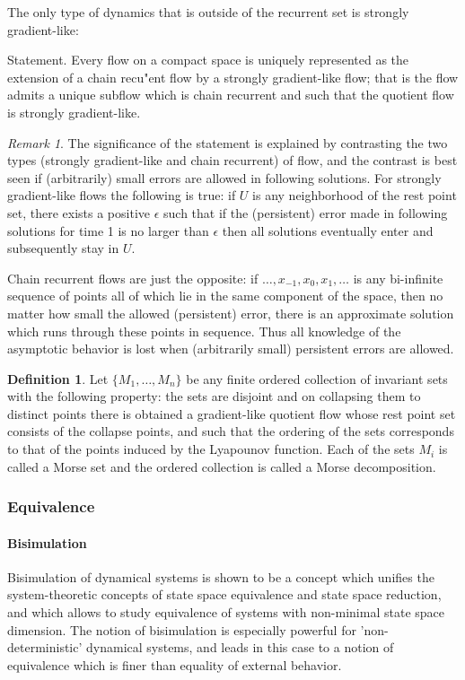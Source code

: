 \documentclass{scrartcl}
\theoremstyle{definition}
\newtheorem{definition}{Definition}
\theoremstyle{remark}
\newtheorem{remark}{Remark}
\begin{document}
The only type of dynamics that is outside of the recurrent set is strongly gradient-like:

Statement. Every flow on a compact space is uniquely represented as the extension of a chain recu"ent flow by a strongly gradient-like flow; that is the flow admits a unique subflow which is chain recurrent and such that the quotient flow is strongly gradient-like.

\begin{remark}\label{rem:error_noise}
The significance of the statement is explained by contrasting the two types (strongly gradient-like and chain recurrent) of flow, and the contrast is best seen if (arbitrarily) small errors are allowed in following solutions. For strongly gradient-like flows the following is true: if $U$ is any neighborhood of the rest point set, there exists a positive $\epsilon$ such that if the (persistent) error made in following solutions for time 1 is no larger than $\epsilon$ then all solutions eventually enter and subsequently stay in $U$.

Chain recurrent flows are just the opposite: if $\dots,x_{-1},x_0, x_{1},\dots$ is any bi-infinite sequence of points all of which lie in the same component of the space, then no matter how small the allowed (persistent) error, there is an approximate solution which runs through these points in sequence. Thus all knowledge of the asymptotic behavior is lost when (arbitrarily small) persistent errors are allowed.
\end{remark}

\begin{definition}
Let $\{M_1, \dots, M_n\}$ be any finite ordered collection of invariant sets with the following property: the sets are disjoint and on collapsing them to distinct points there is obtained a gradient-like quotient flow whose rest point set consists of the collapse points, and such that the ordering of the sets corresponds to that of the points induced by the Lyapounov function.
 Each of the sets $M_i$ is called a Morse set and the ordered collection is called a Morse decomposition.
\end{definition}


\subsubsection{Equivalence}
\paragraph{Bisimulation}
Bisimulation of dynamical systems is shown to be a concept which unifies the system-theoretic concepts of state space
equivalence and state space reduction, and which allows to study equivalence of systems with non-minimal state space dimension. 
The notion of bisimulation is especially powerful for ’non-deterministic’ dynamical systems, and leads in this case to a notion of equivalence which is finer than equality of external behavior.
\end{document}
